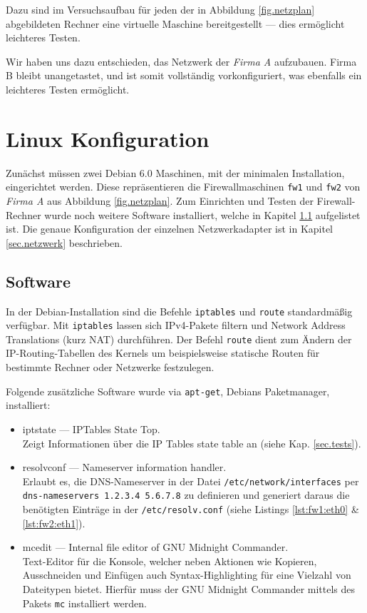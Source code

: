 Dazu sind im Versuchsaufbau für jeden der in Abbildung 
\ref{fig.netzplan} abgebildeten Rechner
eine virtuelle Maschine bereitgestellt --- dies ermöglicht leichteres
Testen.

Wir haben uns dazu entschieden, das Netzwerk der \emph{Firma A} aufzubauen.
Firma B bleibt unangetastet, und ist somit vollständig vorkonfiguriert,
was ebenfalls ein leichteres Testen ermöglicht.\cite{labor}


\section{Linux Konfiguration}

Zunächst müssen zwei Debian 6.0 Maschinen,
mit der minimalen Installation, eingerichtet werden.
Diese repräsentieren die Firewallmaschinen {\tt fw1} und {\tt fw2} von
\emph{Firma A} aus Abbildung \ref{fig.netzplan}.
Zum Einrichten und Testen der Firewall-Rechner wurde noch weitere Software
installiert, welche in Kapitel \ref{sec.software} aufgelistet ist.
Die genaue Konfiguration der einzelnen Netzwerkadapter ist in Kapitel
\ref{sec.netzwerk} beschrieben.

\subsection{Software}\label{sec.software}

In der Debian-Installation sind die Befehle {\tt iptables} und {\tt route}
standardmäßig verfügbar.
Mit {\tt iptables} lassen sich IPv4-Pakete filtern und Network Address
Translations (kurz NAT) durchführen.
Der Befehl {\tt route} dient zum Ändern der IP-Routing-Tabellen des Kernels um
beispielsweise statische Routen für bestimmte Rechner oder Netzwerke
festzulegen.

Folgende zusätzliche Software wurde via {\tt apt-get}, Debians Paketmanager,
installiert:

\begin{itemize}
    \item iptstate --- IPTables State Top.\\
        Zeigt Informationen über die IP Tables state table an (siehe Kap.
        \ref{sec.tests}).
    \item resolvconf --- Nameserver information handler.\\
        Erlaubt es, die DNS-Nameserver in der Datei
        {\tt /etc/network/interfaces}
        per {\tt dns-nameservers 1.2.3.4 5.6.7.8} zu definieren und
        generiert daraus die benötigten Einträge in der {\tt /etc/resolv.conf}
        (siehe Listings \ref{lst:fw1:eth0} \& \ref{lst:fw2:eth1}).
    \item mcedit --- Internal file editor of GNU Midnight Commander.\\
        Text-Editor für die Konsole, welcher neben Aktionen wie Kopieren,
        Ausschneiden und Einfügen auch Syntax-Highlighting für eine Vielzahl von
        Dateitypen bietet. Hierfür muss der GNU Midnight Commander mittels des
        Pakets {\tt mc} installiert werden.
\end{itemize}



